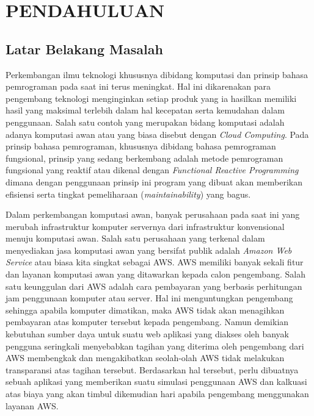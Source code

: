 \documentclass[pi.tex]{subfile}
\begin{document}
\chapter{PENDAHULUAN}
\section{Latar Belakang Masalah}
Perkembangan ilmu teknologi khususnya dibidang komputasi dan prinsip bahasa pemrograman pada saat ini terus meningkat. Hal ini dikarenakan para pengembang teknologi menginginkan setiap produk yang ia hasilkan memiliki hasil yang maksimal terlebih dalam hal kecepatan serta kemudahan dalam penggunaan. Salah satu contoh yang merupakan bidang komputasi adalah adanya komputasi awan atau yang biasa disebut dengan \emph{Cloud Computing}. Pada prinsip bahasa pemrograman, khususnya dibidang bahasa pemrograman fungsional, prinsip yang sedang berkembang adalah metode pemrograman fungsional yang reaktif atau dikenal dengan \emph{Functional Reactive Programming} dimana dengan penggunaan prinsip ini program yang dibuat akan memberikan efisiensi serta tingkat pemeliharaan (\emph{maintainability}) yang bagus.

Dalam perkembangan komputasi awan, banyak perusahaan pada saat ini yang merubah infrastruktur komputer servernya dari infrastruktur konvensional menuju komputasi awan. Salah satu perusahaan yang terkenal dalam menyediakan jasa komputasi awan yang bersifat publik adalah \emph{Amazon Web Service} atau biasa kita singkat sebagai AWS. AWS memiliki banyak sekali fitur dan layanan komputasi awan yang ditawarkan kepada calon pengembang. Salah satu keunggulan dari AWS adalah cara pembayaran yang berbasis perhitungan jam penggunaan komputer atau server. Hal ini menguntungkan pengembang sehingga apabila komputer dimatikan, maka AWS tidak akan menagihkan pembayaran atas komputer tersebut kepada pengembang. Namun demikian kebutuhan sumber daya untuk suatu web aplikasi yang diakses oleh banyak pengguna seringkali menyebabkan tagihan yang diterima oleh pengembang dari AWS membengkak dan mengakibatkan seolah-olah AWS tidak melakukan transparansi atas tagihan tersebut. Berdasarkan hal tersebut, perlu dibuatnya sebuah aplikasi yang memberikan suatu simulasi penggunaan AWS dan kalkuasi atas biaya yang akan timbul dikemudian hari apabila pengembang menggunakan layanan AWS.
\end{document}
